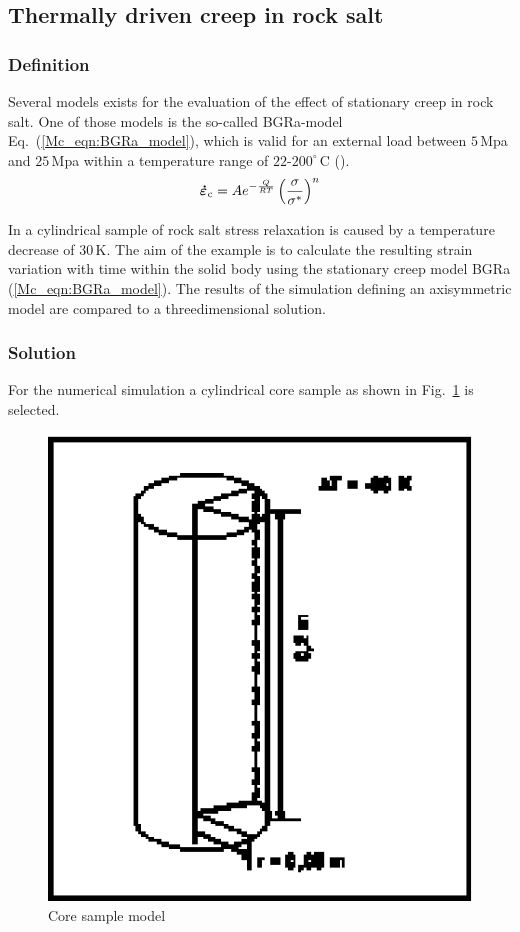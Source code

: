 \subsection{Thermally driven creep in rock salt}
\label{subsec:Mc2}

\subsubsection{Definition}
\label{subsubsec:Mc2_def}

Several models exists for the evaluation of the effect of stationary creep in rock salt. One of those models is the so-called BGRa-model Eq.~(\ref{Mc_eqn:BGRa_model}), which is valid for an external load between $5\,$Mpa and $25\,$Mpa within a temperature range of $22$-$200^{\circ}\,$C (\cite{HunSchu:94}).
%
\begin{equation}
\miu{\varepsilon}{\mathrm{c}}{\dot}
=
A e^{-\frac{Q}{R T}}
\left( \frac{\sigma}{\sigma^*} \right)^n
\label{Mc_eqn:BGRa_model}
\end{equation}

In a cylindrical sample of rock salt stress relaxation is caused by a temperature decrease of $30\,$K. The aim of the example is to calculate the resulting strain variation with time within the solid body using the stationary creep model BGRa (\ref{Mc_eqn:BGRa_model}). The results of the simulation defining an axisymmetric model are compared to a threedimensional solution.

\subsubsection{Solution}
\label{subsubsec:Mc2_sol}

For the numerical simulation a cylindrical core sample as shown in Fig.~\ref{Mc_fig:creep_salt_1} is selected.
%
\begin{figure}[htb]
\centering
\includegraphics[scale=0.8]{PART_II/M/creep_salt_1}
\caption{Core sample model}
\label{Mc_fig:creep_salt_1}
\end{figure}


